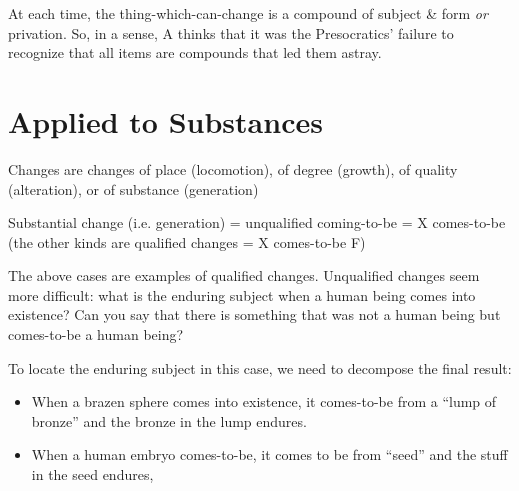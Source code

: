 \documentclass[oneside]{article}
\begin{document}
\noindent At each time, the thing-which-can-change is a compound of subject \& form \emph{or} privation. So, in a sense, A thinks that it was the Presocratics' failure to recognize that all items are compounds that led them astray.

\section*{Applied to Substances}

\noindent Changes are changes of place (locomotion), of degree (growth), of quality (alteration), or of substance (generation)
\vspace*{2mm}

\noindent Substantial change (i.e. generation) = unqualified coming-to-be = X comes-to-be (the other kinds are qualified changes = X comes-to-be F)
\vspace*{2mm}

\noindent The above cases are examples of qualified changes. Unqualified changes seem more difficult: what is the enduring subject when a human being comes into existence? Can you say that there is something that was not a human being but comes-to-be a human being?
\vspace*{2mm}

\noindent To locate the enduring subject in this case, we need to decompose the final result:
\vspace*{1mm}
\begin{itemize}
\item When a brazen sphere comes into existence, it comes-to-be from a ``lump of bronze'' and the bronze in the lump endures.
\vspace*{1mm}
\item When a human embryo comes-to-be, it comes to be from ``seed'' and the stuff in the seed endures,
\end{itemize}
\end{document}
